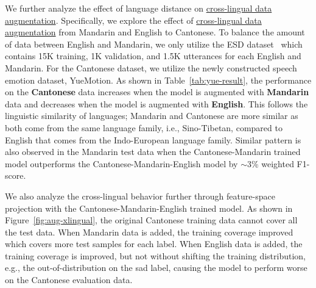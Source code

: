 \documentclass{INTERSPEECH2023}
\newcommand{\ulcolor}[2][]{\setulcolor{#1}\ul{#2}}
\begin{document}
We further analyze the effect of language distance on \ulcolor[darkgreen]{cross-lingual data augmentation}. Specifically, we explore the effect of \ulcolor[darkgreen]{cross-lingual data augmentation} from Mandarin and English to Cantonese. To balance the amount of data between English and Mandarin, we only utilize the ESD dataset~\cite{zhou2022esd} which contains 15K training, 1K validation, and 1.5K utterances for each English and Mandarin. For the Cantonese dataset, we utilize the newly constructed speech emotion dataset, YueMotion. As shown in Table~\ref{tab:yue-result}, the performance on the \textbf{Cantonese} data increases when the model is augmented with \textbf{Mandarin} data and decreases when the model is augmented with \textbf{English}. This follows the linguistic similarity of languages; Mandarin and Cantonese are more similar as both come from the same language family, i.e., Sino-Tibetan, compared to English that comes from the Indo-European language family. Similar pattern is also observed in the Mandarin test data when the Cantonese-Mandarin trained model outperforms the Cantonese-Mandarin-English model by $\sim$3\% weighted F1-score. 

We also analyze the cross-lingual behavior further through feature-space projection with the Cantonese-Mandarin-English trained model. As shown in Figure~\ref{fig:aug-xlingual}, the original Cantonese training data cannot cover all the test data. When Mandarin data is added, the training coverage improved which covers more test samples for each label. When English data is added, the training coverage is improved, but not without shifting the training distribution, e.g., the out-of-distribution on the sad label, causing the model to perform worse on the Cantonese evaluation data.
\end{document}
